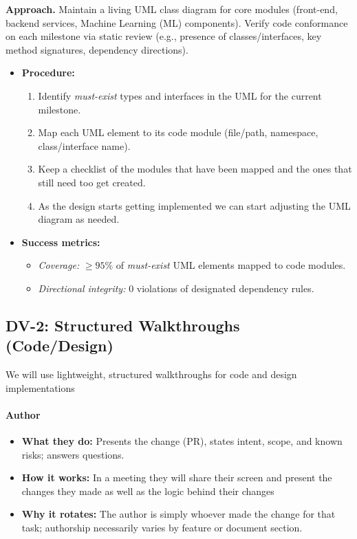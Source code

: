 \documentclass[12pt, titlepage]{article}
\begin{document}
\textbf{Approach.} Maintain a living UML class diagram for core modules (front-end, backend services, Machine Learning (ML) components).
Verify code conformance on each milestone via static review (e.g., presence of classes/interfaces,
key method signatures, dependency directions).
\begin{itemize}
  \item \textbf{Procedure:}
  \begin{enumerate}
    \item Identify \emph{must-exist} types and interfaces in the UML for the current milestone.
    \item Map each UML element to its code module (file/path, namespace, class/interface name).
    \item Keep a checklist of the modules that have been mapped and the ones that still need too get created.
    \item As the design starts getting implemented we can start adjusting the UML diagram as needed.
  \end{enumerate}
  \item \textbf{Success metrics:}
  \begin{itemize}
    \item \emph{Coverage:} $\geq 95\%$ of \emph{must-exist} UML elements mapped to code modules.
    \item \emph{Directional integrity:} $0$ violations of designated dependency rules.
  \end{itemize}
\end{itemize}

\subsection*{DV-2: Structured Walkthroughs (Code/Design)}
We will use lightweight, structured walkthroughs for code and design implementations
\paragraph{Author}
\begin{itemize}
  \item \textbf{What they do:} Presents the change (PR), states intent, scope, and known risks; answers questions.
  \item \textbf{How it works:} In a meeting they will share their screen and present the changes they made as well as the logic behind their changes
  \item \textbf{Why it rotates:} The author is simply whoever made the change for that task; authorship necessarily varies by feature or document section.
\end{itemize}
\end{document}
